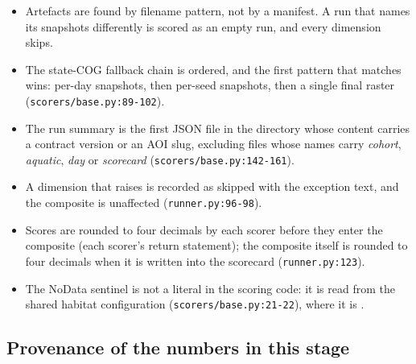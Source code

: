 \documentclass[11pt,a4paper]{article}
\newcommand{\code}[1]{\texttt{#1}}
\begin{document}
\begin{itemize}
\item Artefacts are found by filename pattern, not by a manifest. A run that
      names its snapshots differently is scored as an empty run, and every
      dimension skips.
\item The state-COG fallback chain is ordered, and the first pattern that
      matches wins: per-day snapshots, then per-seed snapshots, then a
      single final raster (\code{scorers/base.py:89-102}).
\item The run summary is the first JSON file in the directory whose content
      carries a contract version or an AOI slug, excluding files whose names
      carry \emph{cohort}, \emph{aquatic}, \emph{day} or \emph{scorecard}
      (\code{scorers/base.py:142-161}).
\item A dimension that raises is recorded as skipped with the exception text,
      and the composite is unaffected (\code{runner.py:96-98}).
\item Scores are rounded to four decimals by each scorer before they enter
      the composite (each scorer's return statement); the composite itself
      is rounded to four decimals when it is written into the scorecard
      (\code{runner.py:123}).
\item The NoData sentinel is not a literal in the scoring code: it is read
      from the shared habitat configuration (\code{scorers/base.py:21-22}),
      where it is .
\end{itemize}

\subsection{Provenance of the numbers in this stage}
\end{document}
